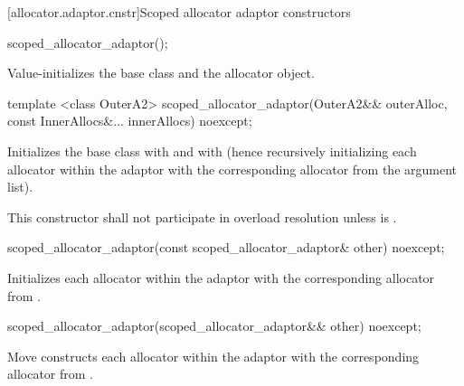 [allocator.adaptor.cnstr]{Scoped allocator adaptor constructors}

%
\begin{itemdecl}
scoped_allocator_adaptor();
\end{itemdecl}

\begin{itemdescr}
\pnum
\effects Value-initializes the  base class and the  allocator
object.
\end{itemdescr}

%
\begin{itemdecl}
template <class OuterA2>
  scoped_allocator_adaptor(OuterA2&& outerAlloc,
                           const InnerAllocs&... innerAllocs) noexcept;
\end{itemdecl}

\begin{itemdescr}
\pnum
\effects Initializes the  base class with
 and  with 
(hence recursively initializing each allocator within the adaptor with the corresponding
allocator from the argument list).

\pnum
\remarks This constructor shall not participate in overload resolution unless
 is .
\end{itemdescr}

%
\begin{itemdecl}
scoped_allocator_adaptor(const scoped_allocator_adaptor& other) noexcept;
\end{itemdecl}

\begin{itemdescr}
\pnum
\effects Initializes each allocator within the adaptor with the corresponding allocator
from .
\end{itemdescr}

%
\begin{itemdecl}
scoped_allocator_adaptor(scoped_allocator_adaptor&& other) noexcept;
\end{itemdecl}

\begin{itemdescr}
\pnum
\effects Move constructs each allocator within the adaptor with the corresponding allocator
from .
\end{itemdescr}

